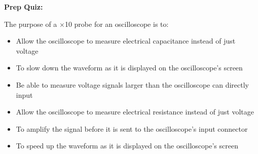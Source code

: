 \vfil \eject

\noindent
{\bf Prep Quiz:}

The purpose of a $\times$10 probe for an oscilloscope is to:

\begin{itemize}
\item{} Allow the oscilloscope to measure electrical capacitance instead of just voltage 
\vskip 5pt 
\item{} To slow down the waveform as it is displayed on the oscilloscope's screen
\vskip 5pt 
\item{} Be able to measure voltage signals larger than the oscilloscope can directly input
\vskip 5pt 
\item{} Allow the oscilloscope to measure electrical resistance instead of just voltage
\vskip 5pt 
\item{} To amplify the signal before it is sent to the oscilloscope's input connector
\vskip 5pt 
\item{} To speed up the waveform as it is displayed on the oscilloscope's screen 
\end{itemize}




